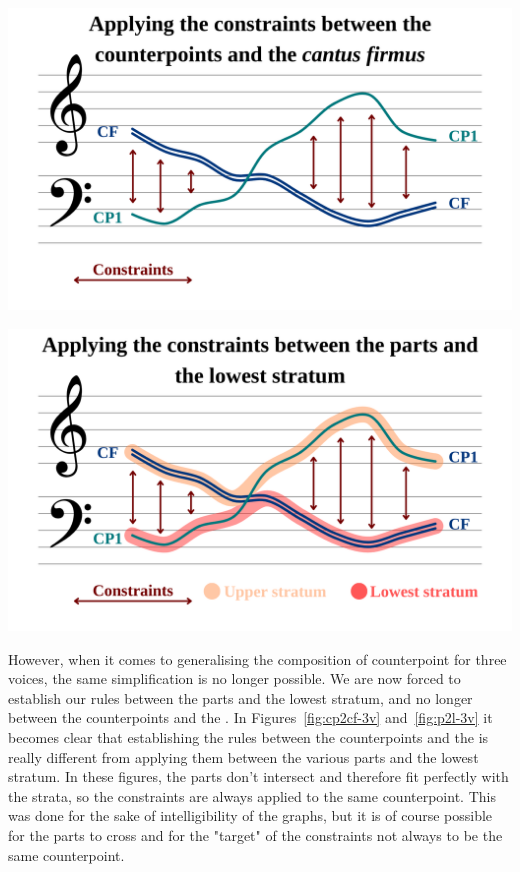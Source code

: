 \vspace{.5cm}
\begin{minipage}{0.46\textwidth}
    \centering
    \includegraphics[width=\textwidth]{Images/cp2cf-2v.png}
    \label{fig:cp2cf-2v}
    \end{minipage}
    \hfill
    \begin{minipage}{0.46\textwidth}
      \centering
      \includegraphics[width=\textwidth]{Images/p2l-2v.png}
      \label{fig:p2l-2v}
\end{minipage}
\vspace{.5cm}

However, when it comes to generalising the composition of counterpoint for three voices, the same simplification is no longer possible. We are now forced to establish our rules between the parts and the lowest stratum, and no longer between the counterpoints and the \cf. In Figures~\ref{fig:cp2cf-3v} and~\ref{fig:p2l-3v} it becomes clear that establishing the rules between the counterpoints and the \cfs is really different from applying them between the various parts and the lowest stratum. In these figures, the parts don't intersect and therefore fit perfectly with the strata, so the constraints are always applied to the same counterpoint. This was done for the sake of intelligibility of the graphs, but it is of course possible for the parts to cross and for the "target" of the constraints not always to be the same counterpoint.

